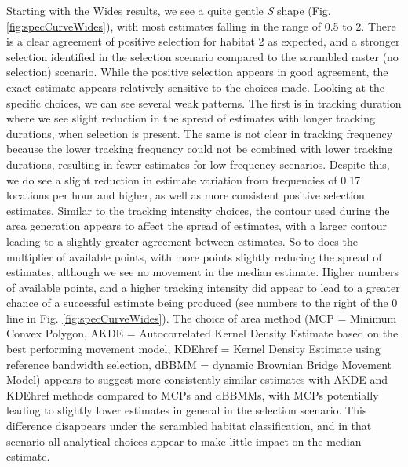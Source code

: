 \documentclass[10pt,a4paper]{article}
\begin{document}
Starting with the Wides results, we see a quite gentle \emph{S} shape (Fig. \ref{fig:specCurveWides}), with most estimates falling in the range of 0.5 to 2.
There is a clear agreement of positive selection for habitat 2 as expected, and a stronger selection identified in the selection scenario compared to the scrambled raster (no selection) scenario.
While the positive selection appears in good agreement, the exact estimate appears relatively sensitive to the choices made.
Looking at the specific choices, we can see several weak patterns.
The first is in tracking duration where we see slight reduction in the spread of estimates with longer tracking durations, when selection is present.
The same is not clear in tracking frequency because the lower tracking frequency could not be combined with lower tracking durations, resulting in fewer estimates for low frequency scenarios.
Despite this, we do see a slight reduction in estimate variation from frequencies of 0.17 locations per hour and higher, as well as more consistent positive selection estimates.
Similar to the tracking intensity choices, the contour used during the area generation appears to affect the spread of estimates, with a larger contour leading to a slightly greater agreement between estimates.
So to does the multiplier of available points, with more points slightly reducing the spread of estimates, although we see no movement in the median estimate.
Higher numbers of available points, and a higher tracking intensity did appear to lead to a greater chance of a successful estimate being produced (see numbers to the right of the 0 line in Fig. \ref{fig:specCurveWides}).
The choice of area method (MCP = Minimum Convex Polygon, AKDE = Autocorrelated Kernel Density Estimate based on the best performing movement model, KDEhref = Kernel Density Estimate using reference bandwidth selection, dBBMM = dynamic Brownian Bridge Movement Model) appears to suggest more consistently similar estimates with AKDE and KDEhref methods compared to MCPs and dBBMMs, with MCPs potentially leading to slightly lower estimates in general in the selection scenario.
This difference disappears under the scrambled habitat classification, and in that scenario all analytical choices appear to make little impact on the median estimate.
\end{document}
